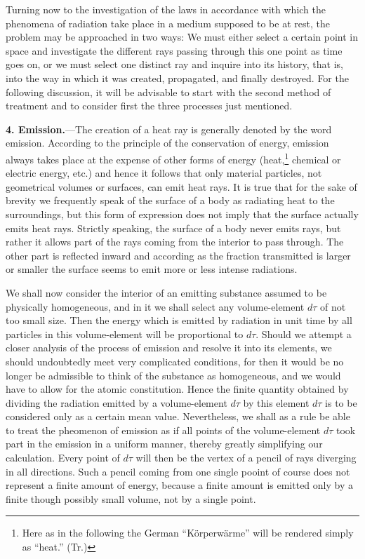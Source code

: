 \documentclass[12pt,oneside]{book}
\begin{document}
Turning now to the investigation of the laws in accordance with which the phenomena of radiation take place in a medium supposed to be at rest, the problem may be approached in two ways: We must either select a certain point in space and investigate the different rays passing through this one point as time goes on, or we must select one distinct ray and inquire into its history, that is, into the way in which it was created, propagated, and finally destroyed. For the following discussion, it will be advisable to start with the second method of treatment and to consider first the three processes just mentioned. \par 

\textbf{4. Emission.}---The creation of a heat ray is generally denoted by the word emission. According to the principle of the conservation of energy, emission always takes place at the expense of other forms of energy (heat,\footnote{Here as in the following the German ``K\"orperw\"arme'' will be rendered simply as ``heat.'' (Tr.)} chemical or electric energy, etc.) and hence it follows that only material particles, not geometrical volumes or surfaces, can emit heat rays. It is true that for the sake of brevity we frequently speak of the surface of a body as radiating heat to the surroundings, but this form of expression does not imply that the surface actually emits heat rays. Strictly speaking, the surface of a body never emits rays, but rather it allows part of the rays coming from the interior to pass through. The other part is reflected inward and according as the fraction transmitted is larger or smaller the surface seems to emit more or less intense radiations. \par 

We shall now consider the interior of an emitting substance assumed to be physically homogeneous, and in it we shall select any volume-element $d\tau$ of not too small size. Then the energy which is emitted by radiation in unit time by all particles in this volume-element will be proportional to $d\tau$. Should we attempt a closer analysis of the process of emission and resolve it into its elements, we should undoubtedly meet very complicated conditions, for then it would be no longer be admissible to think of the substance as homogeneous, and we would have to allow for the atomic constitution. Hence the finite quantity obtained by dividing the radiation emitted by a volume-element $d\tau$ by this element $d\tau$ is to be considered only as a certain mean value. Nevertheless, we shall as a rule be able to treat the pheomenon of emission as if all points of the volume-element $d\tau$ took part in the emission in a uniform manner, thereby greatly simplifying our calculation. Every point of $d\tau$ will then be the vertex of a pencil of rays diverging in all directions. Such a pencil coming from one single pooint of course does not represent a finite amount of energy, because a finite amount is emitted only by a finite though possibly small volume, not by a single point. \par 
\end{document}
